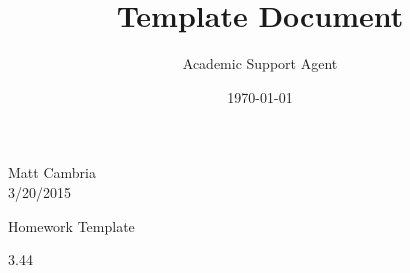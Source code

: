 \documentclass{article}
\title{Template Document}
\author{Academic Support Agent}
\date{\today}
\begin{document}
\maketitle

\setlength{\belowdisplayskip}{5pt} \setlength{\belowdisplayshortskip}{0pt}
\setlength{\abovedisplayskip}{-10pt} \setlength{\abovedisplayshortskip}{0pt}

\begin{flushright}
Matt Cambria\\
3/20/2015\\
\end{flushright}

\begin{center}
Homework Template\\
\end{center}


\begin{exercise}{3.44}
\end{exercise}

\begin{flushleft}



\end{flushleft} 



\end{document}
